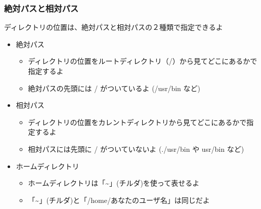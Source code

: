 \begin{frame}
    \frametitle{絶対パスと相対パス}
    ディレクトリの位置は、絶対パスと相対パスの２種類で指定できるよ\\
    \begin{itemize}
        \item 絶対パス
        \begin{itemize}
            \item ディレクトリの位置をルートディレクトリ（/）から見てどこにあるかで指定するよ
            \item 絶対パスの先頭には / がついているよ (/usr/bin など)
        \end{itemize}
        \item 相対パス
        \begin{itemize}
            \item ディレクトリの位置をカレントディレクトリから見てどこにあるかで指定するよ
            \item 相対パスには先頭に / がついていないよ (./usr/bin や usr/bin など)
        \end{itemize}
        \item ホームディレクトリ
        \begin{itemize}
            \item ホームディレクトリは「\textasciitilde」(チルダ)を使って表せるよ
            \item 「\textasciitilde」(チルダ)と「/home/あなたのユーザ名」は同じだよ
        \end{itemize}
    \end{itemize}
\end{frame}

